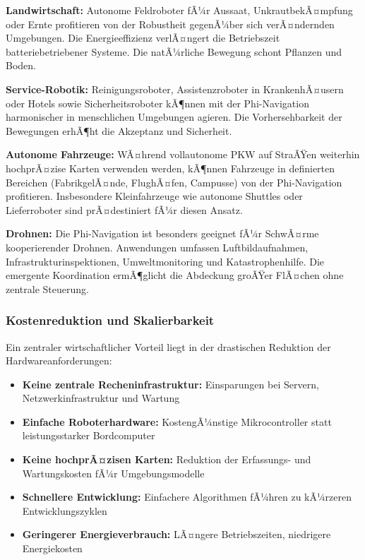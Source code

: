 ﻿\documentclass[a4paper,12pt]{article}
\theoremstyle{definition}
\begin{document}
\textbf{Landwirtschaft:} Autonome Feldroboter fÃ¼r Aussaat, UnkrautbekÃ¤mpfung oder Ernte profitieren von der Robustheit gegenÃ¼ber sich verÃ¤ndernden Umgebungen. Die Energieeffizienz verlÃ¤ngert die Betriebszeit batteriebetriebener Systeme. Die natÃ¼rliche Bewegung schont Pflanzen und Boden.

\textbf{Service-Robotik:} Reinigungsroboter, Assistenzroboter in KrankenhÃ¤usern oder Hotels sowie Sicherheitsroboter kÃ¶nnen mit der Phi-Navigation harmonischer in menschlichen Umgebungen agieren. Die Vorhersehbarkeit der Bewegungen erhÃ¶ht die Akzeptanz und Sicherheit.

\textbf{Autonome Fahrzeuge:} WÃ¤hrend vollautonome PKW auf StraÃŸen weiterhin hochprÃ¤zise Karten verwenden werden, kÃ¶nnen Fahrzeuge in definierten Bereichen (FabrikgelÃ¤nde, FlughÃ¤fen, Campusse) von der Phi-Navigation profitieren. Insbesondere Kleinfahrzeuge wie autonome Shuttles oder Lieferroboter sind prÃ¤destiniert fÃ¼r diesen Ansatz.

\textbf{Drohnen:} Die Phi-Navigation ist besonders geeignet fÃ¼r SchwÃ¤rme kooperierender Drohnen. Anwendungen umfassen Luftbildaufnahmen, Infrastrukturinspektionen, Umweltmonitoring und Katastrophenhilfe. Die emergente Koordination ermÃ¶glicht die Abdeckung groÃŸer FlÃ¤chen ohne zentrale Steuerung.

\subsubsection{Kostenreduktion und Skalierbarkeit}

Ein zentraler wirtschaftlicher Vorteil liegt in der drastischen Reduktion der Hardwareanforderungen:

\begin{itemize}
	\item \textbf{Keine zentrale Recheninfrastruktur:} Einsparungen bei Servern, Netzwerkinfrastruktur und Wartung
	\item \textbf{Einfache Roboterhardware:} KostengÃ¼nstige Mikrocontroller statt leistungsstarker Bordcomputer
	\item \textbf{Keine hochprÃ¤zisen Karten:} Reduktion der Erfassungs- und Wartungskosten fÃ¼r Umgebungsmodelle
	\item \textbf{Schnellere Entwicklung:} Einfachere Algorithmen fÃ¼hren zu kÃ¼rzeren Entwicklungszyklen
	\item \textbf{Geringerer Energieverbrauch:} LÃ¤ngere Betriebszeiten, niedrigere Energiekosten
\end{itemize}
\end{document}
